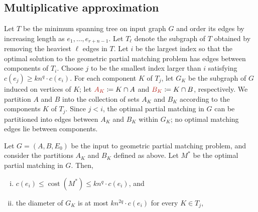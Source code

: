 \documentclass[a4paper,UKenglish]{socg-lipics-v2018}
\makeatletter
\def\polylog{\mathop{\mathrm{polylog}}}
\def\eps{\varepsilon}
\def\cost{\operatorname{cost}}
\theoremstyle{plain}
\numberwithin{figure}{section}
\def\EMPH#1{\textcolor{BrickRed}{{\emph{#1}}}}
\def\n@te#1{\textsf{\boldmath \textbf{$\langle\!\langle$#1$\rangle\!\rangle$}}\leavevmode}
\def\note#1{\textcolor{red}{\n@te{#1}}}
\renewcommand{\note}[1]{} %
\makeatother
\begin{document}


\begin{toappendix}
\subsection{Multiplicative approximation}
\label{SSA:multiplicative-approx}

Let $T$ be the minimum spanning tree on input graph $G$ and order
its edges by increasing length as $e_1, \ldots, e_{r+n-1}$.
Let $T_\ell$ denote the subgraph of $T$ obtained by removing the heaviest $\ell$ edges in $T$.
%
Let $i$ be the largest index so that
the optimal solution to the geometric partial matching problem has edges between components of $T_i$.
Choose $j$ to be the smallest index larger than $i$ satisfying
$c(e_j) \geq kn^q \cdot c(e_i)$.
For each component $K$ of $T_j$, let
$G_K$ be the subgraph of $G$ induced on vertices of $K$;
let $\EMPH{$A_K$} \coloneqq K \cap A$ and $\EMPH{$B_K$} \coloneqq K \cap B$, respectively.
We partition $A$ and $B$ into the collection of sets $A_K$ and $B_K$ according to the components $K$ of $T_j$.
Since $j < i$, the optimal partial matching in $G$ can be partitioned into edges between $A_K$ and $B_K$ within $G_K$; no optimal matching edges lie between components.

\begin{lemma}
\label{lemma:sa_partition}
%
Let $G = (A,B,E_0)$ be the input to geometric partial matching problem, and consider the partitions $A_K$ and $B_K$ defined as above.
Let $M^*$ be the optimal partial matching in $G$.
Then,
\begin{enumerate}[(i)]
\item $c(e_i) \leq \cost(M^*) \le kn^q \cdot c(e_i)$, and
\item the diameter of $G_K$ is at most $kn^{2q} \cdot c(e_i)$ for every $K \in T_j$,
\end{enumerate}
\end{lemma}


\end{toappendix}
\end{document}
